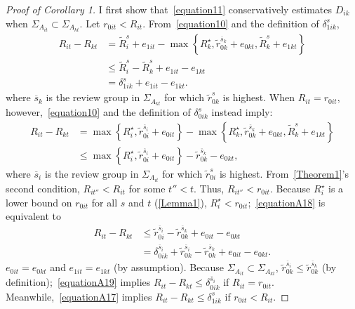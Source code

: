 \begin{proof}[Proof of Corollary 1]
	I first show that~\autoref{equation11} conservatively estimates $D_{ik}$ when $\Sigma_{A_{it}}\subset\Sigma_{A_{kt}}$. Let $r_{0it}<R_{it}$. From~\autoref{equation10} and the definition of $\delta_{1ik}^s$,
	\begin{align}\label{equationA17}
		R_{it} - R_{kt}	&=		\widetilde R_i^s + e_{1it} - \max\left\{R_k^\star,\widetilde r_{0k}^{\overline s_k} + e_{0kt},\widetilde R_k^s + e_{1kt}\right\}\nonumber\\
						&\le	\widetilde R_i^s - \widetilde R_k^s + e_{1it} - e_{1kt}\nonumber\\
						&=	\delta_{1ik}^s + e_{1it} - e_{1kt}.
	\end{align}
	where $\overline s_k$ is the review group in $\Sigma_{A_{kt}}$ for which $\widetilde r_{0k}^s$ is highest. When $R_{it}=r_{0it}$, however,~\autoref{equation10} and the definition of $\delta_{0ik}^s$ instead imply:
	\begin{align}\label{equationA18}
		R_{it} - R_{kt}	&=		\max\left\{R_i^\star, \widetilde r_{0i}^{\overline s_i} + e_{0it}\right\} - \max\left\{R_k^\star,\widetilde r_{0k}^{\overline s_k} + e_{0kt},\widetilde R_k^s + e_{1kt}\right\}\nonumber\\
						&\le	\max\left\{R_i^\star, \widetilde r_{0i}^{\overline s_i} + e_{0it}\right\} - \widetilde r_{0k}^{\overline s_k} - e_{0kt},
	\end{align}
	where $\overline s_i$ is the review group in $\Sigma_{A_{it}}$ for which $\widetilde r_{0i}^s$ is highest. From~\autoref{Theorem1}'s second condition, $R_{it''}<R_{it}$ for some $t''<t$. Thus, $R_{it''}<r_{0it}$. Because $R_i^\star$ is a lower bound on $r_{0it}$ for all $s$ and $t$ (\autoref{Lemma1}), $R_i^\star<r_{0it}$;~\autoref{equationA18} is equivalent to
	\begin{align}\label{equationA19}
		R_{it} - R_{kt}	&\le	\widetilde r_{0i}^{\overline s_i} - \widetilde r_{0k}^{\overline s_k} + e_{0it} - e_{0kt}\nonumber\\
						&=		\delta_{0ik}^{\overline s_i} + \widetilde r_{0k}^{\overline s_i} - \widetilde r_{0k}^{\overline s_k} + e_{0it} - e_{0kt}.
	\end{align}
	$e_{0it}=e_{0kt}$ and $e_{1it}=e_{1kt}$ (by assumption). Because $\Sigma_{A_{it}}\subset\Sigma_{A_{kt}}$, $\widetilde r_{0k}^{\overline s_i}\le\widetilde r_{0k}^{\overline s_k}$ (by definition);~\autoref{equationA19} implies $R_{it}-R_{kt}\le\delta_{0ik}^{\overline s_i}$ if $R_{it}=r_{0it}$. Meanwhile,~\autoref{equationA17} implies $R_{it}-R_{kt}\le\delta_{1ik}^s$ if $r_{0it}<R_{it}$.
	

\end{proof}
